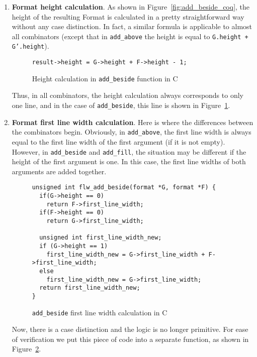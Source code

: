 \documentclass[14pt]{constructor-diploma}
\begin{document}
\begin{enumerate}
  \item \textbf{Format height calculation}. As shown in Figure~\ref{fig:add_beside_coq}, the height of the resulting Format is calculated 
  in a pretty straightforward way without any case distinction.
  In fact, a similar formula is applicable to almost all combinators (except that in \texttt{add\_above} the height is equal to \texttt{G.height + G'.height}). 
\begin{figure}[H]
\begin{mdframed}[backgroundcolor=bg]
\begin{verbatim}
result->height = G->height + F->height - 1;
\end{verbatim}
\end{mdframed}
\caption{Height calculation in \texttt{add\_beside} function in C}
\label{fig:height_calculation}
\end{figure}
  Thus, in all combinators, the height calculation always corresponds to only one line, and in the case of \texttt{add\_beside}, this line is shown in Figure~\ref{fig:height_calculation}.

  \item \textbf{Format first line width calculation}. Here is where the differences between the combinators begin. 
  Obviously, in \texttt{add\_above}, the first line width is always equal to the first line width of the first argument (if it is not empty). 
  However, in \texttt{add\_beside} and \texttt{add\_fill}, the situation may be different if the height of the first argument is one. 
  In this case, the first line widths of both arguments are added together.
\begin{figure}[H]
\begin{mdframed}[backgroundcolor=bg]
\begin{verbatim}
unsigned int flw_add_beside(format *G, format *F) {
  if(G->height == 0)
    return F->first_line_width;
  if(F->height == 0)
    return G->first_line_width;

  unsigned int first_line_width_new;
  if (G->height == 1)
    first_line_width_new = G->first_line_width + F->first_line_width;
  else
    first_line_width_new = G->first_line_width;
  return first_line_width_new;
}
\end{verbatim}
\end{mdframed}
\caption{\texttt{add\_beside} first line width calculation in C}
\label{fig:flw_calculation}
\end{figure}
  Now, there is a case distinction and the logic is no longer primitive. For ease of verification we put this piece of code into a separate function, as shown in Figure~\ref{fig:flw_calculation}.


\end{enumerate}
\end{document}
